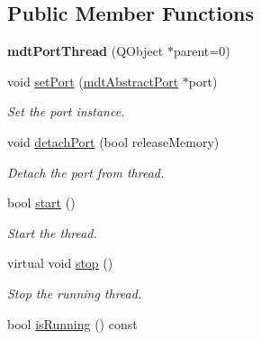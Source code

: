 \subsection*{Public Member Functions}
\begin{DoxyCompactItemize}
\item 
\hypertarget{classmdt_port_thread_aa20869c68d7a016f9e547464f0d8b71e}{
{\bfseries mdtPortThread} (QObject $\ast$parent=0)}
\label{classmdt_port_thread_aa20869c68d7a016f9e547464f0d8b71e}

\item 
void \hyperlink{classmdt_port_thread_acd51474c3a2683676423317bc9cb31b2}{setPort} (\hyperlink{classmdt_abstract_port}{mdtAbstractPort} $\ast$port)
\begin{DoxyCompactList}\small\item\em Set the port instance. \end{DoxyCompactList}\item 
void \hyperlink{classmdt_port_thread_a29b434534a5564efbd9dfe570a61b143}{detachPort} (bool releaseMemory)
\begin{DoxyCompactList}\small\item\em Detach the port from thread. \end{DoxyCompactList}\item 
bool \hyperlink{classmdt_port_thread_a9c45f260b8d58b7475151df79b3d8510}{start} ()
\begin{DoxyCompactList}\small\item\em Start the thread. \end{DoxyCompactList}\item 
virtual void \hyperlink{classmdt_port_thread_a5746ea96689ed80179751ad1353f0b39}{stop} ()
\begin{DoxyCompactList}\small\item\em Stop the running thread. \end{DoxyCompactList}\item 
\hypertarget{classmdt_port_thread_ae1becf17263dd9fbf5dfcc6c51eddd72}{
bool \hyperlink{classmdt_port_thread_ae1becf17263dd9fbf5dfcc6c51eddd72}{isRunning} () const }
\label{classmdt_port_thread_ae1becf17263dd9fbf5dfcc6c51eddd72}


\end{DoxyCompactItemize}
